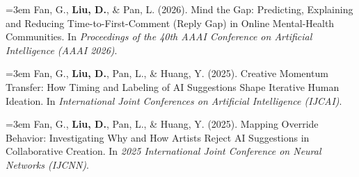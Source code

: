 \documentclass[a4paper,11pt]{article}
\newcommand{\publication}[2]{%
  \par\addvspace{8pt}\noindent
  \begin{minipage}{\linewidth}
    \fontsize{10.8}{13.4}\selectfont\raggedright
    \hangindent=3em\hangafter=1
    \makebox[3em][l]{\textcolor{teal}{[#1]}}#2
  \end{minipage}\par}
\begin{document}
\publication{R10}{Fan, G., \textbf{Liu, D.}, \& Pan, L. (2026). Mind the Gap: Predicting, Explaining and Reducing Time-to-First-Comment (Reply Gap) in Online Mental-Health Communities. In \emph{Proceedings of the 40th AAAI Conference on Artificial Intelligence (AAAI 2026)}.}

\publication{R11}{Fan, G., \textbf{Liu, D.}, Pan, L., \& Huang, Y. (2025). Creative Momentum Transfer: How Timing and Labeling of AI Suggestions Shape Iterative Human Ideation. In \emph{International Joint Conferences on Artificial Intelligence (IJCAI)}.}

\publication{R12}{Fan, G., \textbf{Liu, D.}, Pan, L., \& Huang, Y. (2025). Mapping Override Behavior: Investigating Why and How Artists Reject AI Suggestions in Collaborative Creation. In \emph{2025 International Joint Conference on Neural Networks (IJCNN)}.}

\label{LastPage}
\end{document}

